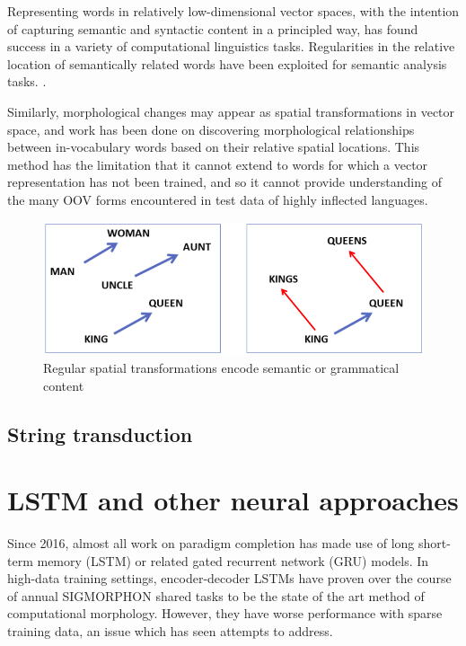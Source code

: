 Representing words in relatively low-dimensional vector spaces, with the intention of capturing semantic and syntactic content in a principled way, has found success in a variety of computational linguistics tasks. Regularities in the relative location of semantically related words have been exploited for semantic analysis tasks. \parencite{Bilmes2003} \parencite{Alexandrescu2006}.

Similarly, morphological changes may appear as spatial transformations in vector space, and work has been done on discovering morphological relationships between in-vocabulary words based on their relative spatial locations. This method has the limitation that it cannot extend to words for which a vector representation has not been trained, and so it cannot provide understanding of the many OOV forms encountered in test data of highly inflected languages. \parencite{Mikolov2013} \parencite{Soricut2015} \parencite{DosSantos2014} \parencite{Cotterell2019} 

\begin{figure}[t]
\includegraphics[width=12cm]{images/semantic_transform.png}
\centering
\caption{Regular spatial transformations encode semantic or grammatical content \parencite{Mikolov2013}}
\end{figure}

\subsection{String transduction}

\section{LSTM and other neural approaches}

Since 2016, almost all work on paradigm completion has made use of long short-term memory (LSTM) or related gated recurrent network (GRU) models. \parencite{Faruqui2015} \parencite{Cotterell2016} \parencite{Cotterell2017} \parencite{Cotterell2018b} \parencite{McCarthy2019} In high-data training settings, encoder-decoder LSTMs have proven over the course of annual SIGMORPHON shared tasks to be the state of the art method of computational morphology. However, they have worse performance with sparse training data, an issue which has seen attempts to address.

